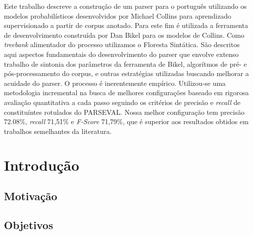 \documentclass[a4paper]{abnt}
\begin{document}


\pagestyle{plain}


\begin{resumo}

Este trabalho descreve a construção de um parser para o português utilizando os modelos probabilísticos desenvolvidos por Michael Collins para aprendizado supervisionado a partir de corpus anotado. 
Para este fim é utilizada a ferramenta de desenvolvimento construída por Dan Bikel para os modelos de Collins. 
Como \emph{treebank} alimentador do processo utilizamos o Floresta Sintática.
São descritos aqui aspectos fundamentais do desenvolvimento do parser que envolve extenso trabalho de sintonia dos parâmetros da ferramenta de Bikel, algorítmos de pré- e pós-processamento do corpus, e outras estratégias utilizadas buscando melhorar a acuidade do parser. 
O processo é inerentemente empírico. Utilizou-se uma metodologia incremental na busca de melhores configurações baseado em rigorosa avaliação quantitativa a cada passo seguindo os critérios de precisão e \emph{recall} de constituíntes rotulados do PARSEVAL. 
Nossa melhor configuração tem precisão 72.08{\%}, \emph{recall} 71,51{\%} e \emph{F-Score} 71,79{\%}, que é superior aos resultados obtidos em trabalhos semelhantes da literatura.

\end{resumo}

\tableofcontents
\listoffigures
\listoftables

%


\setcounter{page}{0}

\chapter{Introdução}
\label{cha:introducao}
\thispagestyle{empty}
    

\section{Motivação}
\label{sec:motivacao}
	

\section{Objetivos}
\label{sec:objetivos}
	
\end{document}

